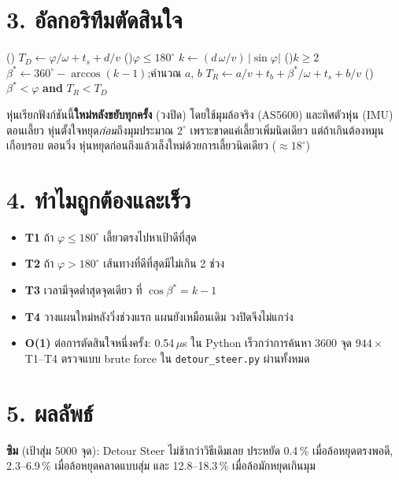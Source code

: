 \documentclass[11pt,a4paper]{article}
\begin{document}
\section*{3. อัลกอริทึมตัดสินใจ}
{\small
\begin{algorithm}[H]
\Pro(){}{
  $T_D \leftarrow \varphi/\omega + t_s + d/v$
  \lIf(){$\varphi \le 180^\circ$}{}
  $k \leftarrow (d\,\omega/v)\,\lvert\sin\varphi\rvert$\;
  \lIf(){$k \ge 2$}{}
  $\beta^\ast \leftarrow 360^\circ - \arccos(k-1)$;\quad คำนวณ $a$, $b$\;
  $T_R \leftarrow a/v + t_b + \beta^\ast/\omega + t_s + b/v$\;
  \lIf(){$\beta^\ast < \varphi$ \textbf{and} $T_R < T_D$}{}
  \;
}
\end{algorithm}
}
หุ่นเรียกฟังก์ชันนี้\textbf{ใหม่หลังขยับทุกครั้ง} (วงปิด) โดยใช้มุมล้อจริง (AS5600) และทิศตัวหุ่น (IMU)
ตอนเลี้ยว หุ่นตั้งใจหยุด\emph{ก่อน}ถึงมุมประมาณ $2^\circ$ เพราะขาดแค่เลี้ยวเพิ่มนิดเดียว แต่ถ้าเกินต้องหมุนเกือบรอบ
ตอนวิ่ง หุ่นหยุดก่อนถึงแล้วเล็งใหม่ด้วยการเลี้ยวนิดเดียว ($\approx 18^\circ$)

\section*{4. ทำไมถูกต้องและเร็ว}
\begin{itemize}\setlength\itemsep{0pt}
\item \textbf{T1} ถ้า $\varphi \le 180^\circ$ เลี้ยวตรงไปหาเป้าดีที่สุด
\item \textbf{T2} ถ้า $\varphi > 180^\circ$ เส้นทางที่ดีที่สุดมีไม่เกิน 2 ช่วง
\item \textbf{T3} เวลามีจุดต่ำสุดจุดเดียว ที่ $\cos\beta^\ast = k-1$
\item \textbf{T4} วางแผนใหม่หลังวิ่งช่วงแรก แผนยังเหมือนเดิม วงปิดจึงไม่แกว่ง
\item \textbf{O(1)} ต่อการตัดสินใจหนึ่งครั้ง: 0.54\,$\mu$s ใน Python เร็วกว่าการค้นหา 3600 จุด $944\times$
      T1--T4 ตรวจแบบ brute force ใน \texttt{detour\_steer.py} ผ่านทั้งหมด
\end{itemize}

\section*{5. ผลลัพธ์}
\textbf{ซิม} (เป้าสุ่ม 5000 จุด): Detour Steer ไม่ช้ากว่าวิธีเดิมเลย
ประหยัด 0.4\,\% เมื่อล้อหยุดตรงพอดี, 2.3--6.9\,\% เมื่อล้อหยุดคลาดแบบสุ่ม
และ 12.8--18.3\,\% เมื่อล้อมักหยุดเกินมุม
\end{document}
